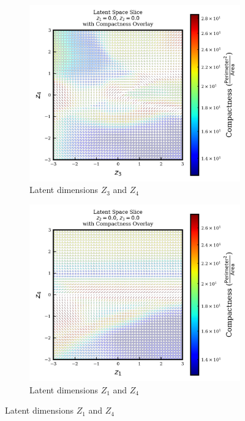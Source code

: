 \documentclass{article}
\begin{document}
\begin{figure}[H]
  \centering

  \begin{subfigure}{0.48\textwidth}
    \centering
    \includegraphics[width=\textwidth]{figures/VAEmodels/model3/varying_z3_z4_fixed_z1=0.0_z2=0.0.png}
    \caption{Latent dimensions $Z_3$ and $Z_4$}
    \label{fig:model3_z3_z4}
  \end{subfigure}
  \hfill
  \begin{subfigure}{0.48\textwidth}
    \centering
    \includegraphics[width=\textwidth]{figures/VAEmodels/model3/varying_z1_z4_fixed_z2=0.0_z3=0.0.png}
    \caption{Latent dimensions $Z_1$ and $Z_4$}
    \label{fig:model3_z1_z4}
  \end{subfigure}


\end{figure}
\end{document}
